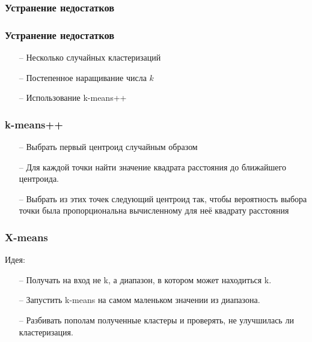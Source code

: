 \documentclass[12pt]{beamer}
\begin{document}
\begin{frame}\frametitle{Устранение недостатков}
\end{frame}

\begin{frame}\frametitle{Устранение недостатков}
\begin{itemize}
\item[--] Несколько случайных кластеризаций
\item[--] Постепенное наращивание числа $k$
\item[--] Использование k-means++
\end{itemize}
\end{frame}

\begin{frame}\frametitle{k-means++}
\begin{itemize}
\item[--] Выбрать первый центроид случайным образом
\item[--] Для каждой точки найти значение квадрата расстояния до ближайшего центроида.
\item[--] Выбрать из этих точек следующий центроид так, чтобы вероятность выбора точки была пропорциональна вычисленному для неё квадрату расстояния
\end{itemize}
\end{frame}

\begin{frame}\frametitle{X-means}
Идея:\\
\begin{itemize}
\item[--] Получать на вход не k, а диапазон, в котором может находиться k.
\item[--] Запустить k-means на самом маленьком значении из диапазона.
\item[--] Разбивать пополам полученные кластеры и проверять, не улучшилась ли кластеризация.
\end{itemize}
\end{frame}
\end{document}
